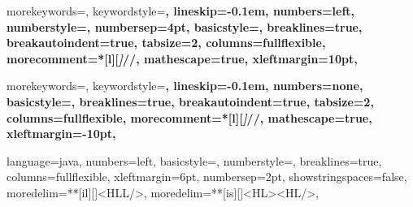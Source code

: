 {
  morekeywords={},
  keywordstyle=\bfseries,
  lineskip=-0.1em,
  numbers=left, %
  numberstyle=\jnumberstyle,
  numbersep=4pt,
  basicstyle=\jbasicstyle,
  breaklines=true,
  breakautoindent=true,
  tabsize=2,
  columns=fullflexible,
  morecomment=*[l][\textsl]{//},
  mathescape=true,
  xleftmargin=10pt,
}

{
  morekeywords={},
  keywordstyle=\bfseries,
  lineskip=-0.1em,
  numbers=none,
  basicstyle=\jbasicstyle,
  breaklines=true,
  breakautoindent=true,
  tabsize=2,
  columns=fullflexible,
  morecomment=*[l][\textsl]{//},
  mathescape=true,
  xleftmargin=-10pt,
}

{
  language=java,
  numbers=left,
  basicstyle=\scriptsize\ttfamily,
  numberstyle=\scriptsize,
  breaklines=true,
  columns=fullflexible,
  xleftmargin=6pt,
  numbersep=2pt,
  showstringspaces=false,
  moredelim=**[il][{\btHLLine[fill=blue!10]}]{<HLL/>},
  moredelim=**[is][{\btHL[fill=blue!20]}]{<HL>}{<HL/>},
}


\newcommand{\JavaIn}[1]{\lstinline[language=java-pretty]{#1}}

